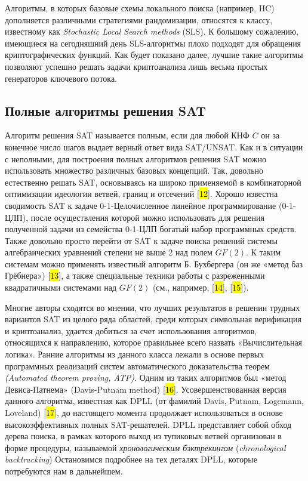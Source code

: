 Алгоритмы, в которых базовые схемы локального поиска (например, HC) дополняется различными стратегиями рандомизации, относятся к классу, известному как \textit{Stochastic Local Search methods} (SLS). К большому сожалению, имеющиеся на сегодняшний день SLS-алгоритмы плохо подходят для обращения криптографических функций. Как будет показано далее, лучшие такие алгоритмы позволяют успешно решать задачи криптоанализа лишь весьма простых генераторов ключевого потока.

\subsection{Полные алгоритмы решения SAT}

Алгоритм решения SAT называется полным, если для любой КНФ $C$ он за конечное число шагов выдает верный ответ вида SAT/UNSAT. Как и в ситуации с неполными, для построения полных алгоритмов решения SAT можно использовать множество различных базовых концепций. Так, довольно естественно решать SAT, основываясь на широко применяемой в комбинаторной оптимизации идеологии ветвей, границ и отсечений {[}\hl{12}{]}. Хорошо известна сводимость SAT к задаче 0-1-Целочисленное линейное программирование (0-1-ЦЛП), после осуществления которой можно использовать для решения полученной задачи из семейства 0-1-ЦЛП богатый набор программных средств. Также довольно просто перейти от SAT к задаче поиска решений системы алгебраических уравнений степени не выше 2 над полем $GF(2)$. К таким системам можно применять известный алгоритм Б. Бухбергера (он же «метод баз Грёбнера») {[}\hl{13}{]}, а также специальные техники работы с разреженными квадратичными системами над $GF(2)$ (см., например, {[}\hl{14}{]}, {[}\hl{15}{]}).

Многие авторы сходятся во мнении, что лучших результатов в решении трудных вариантов SAT из целого ряда областей, среди которых символьная верификация и криптоанализ, удается добиться за счет использования алгоритмов, относящихся к направлению, которое правильнее всего назвать «Вычислительная логика». Ранние алгоритмы из данного класса лежали в основе первых программных реализаций систем автоматического доказательства теорем \textit{(Automated theorem proving, ATP)}. Одним из таких алгоритмов был «метод Девиса-Патнема» (Davis-Putnam method) {[}\hl{16}{]}. Усовершенствованная версия данного алгоритма, известная как DPLL (от фамилий Davis, Putnam, Logemann, Loveland) {[}\hl{17}{]}, до настоящего момента продолжает использоваться в основе высокоэффективных полных SAT-решателей. DPLL представляет собой обход дерева поиска, в рамках которого выход из тупиковых ветвей организован в форме процедуры, называемой \textit{хронологическим бэктрекингом} (\textit{chronological backtracking}) Остановимся подробнее на тех деталях DPLL, которые потребуются нам в дальнейшем.


